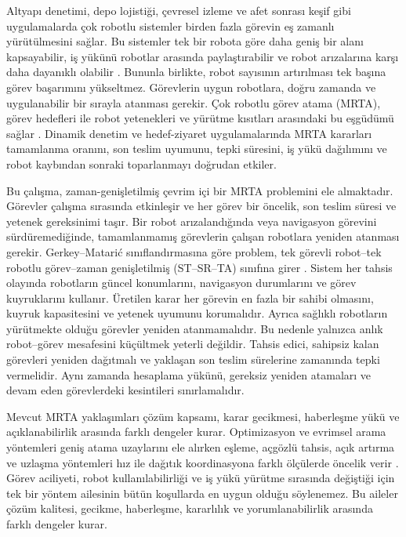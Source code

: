 \documentclass[10pt,letterpaper,onecolumn]{IEEEtran}
\begin{document}
Altyapı denetimi, depo lojistiği, çevresel izleme ve afet sonrası keşif gibi
uygulamalarda çok robotlu sistemler birden fazla görevin eş zamanlı
yürütülmesini sağlar. Bu sistemler tek bir robota göre daha geniş bir alanı
kapsayabilir, iş yükünü robotlar arasında paylaştırabilir ve robot arızalarına
karşı daha dayanıklı olabilir
\cite{khamis2015multi,chakraa2023review}. Bununla birlikte, robot sayısının
artırılması tek başına görev başarımını yükseltmez. Görevlerin uygun robotlara,
doğru zamanda ve uygulanabilir bir sırayla atanması gerekir. Çok robotlu görev
atama (MRTA), görev hedefleri ile robot yetenekleri ve yürütme kısıtları
arasındaki bu eşgüdümü sağlar \cite{gerkey2004formal,
korsah2013comprehensive}. Dinamik denetim ve hedef-ziyaret uygulamalarında MRTA
kararları tamamlanma oranını, son teslim uyumunu, tepki süresini, iş yükü
dağılımını ve robot kaybından sonraki toparlanmayı doğrudan etkiler.

Bu çalışma, zaman-genişletilmiş çevrim içi bir MRTA problemini ele almaktadır.
Görevler çalışma sırasında etkinleşir ve her görev bir öncelik, son teslim süresi
ve yetenek gereksinimi taşır. Bir robot arızalandığında veya navigasyon görevini
sürdüremediğinde, tamamlanmamış görevlerin çalışan robotlara yeniden atanması
gerekir. Gerkey--Matari{\'c} sınıflandırmasına göre problem, tek görevli
robot--tek robotlu görev--zaman genişletilmiş (ST--SR--TA) sınıfına girer
\cite{gerkey2004formal,nunes2017taxonomy}. Sistem her tahsis olayında robotların
güncel konumlarını, navigasyon durumlarını ve görev kuyruklarını kullanır.
Üretilen karar her görevin en fazla bir sahibi olmasını, kuyruk kapasitesini ve
yetenek uyumunu korumalıdır. Ayrıca sağlıklı robotların yürütmekte olduğu
görevler yeniden atanmamalıdır. Bu nedenle yalnızca anlık robot--görev
mesafesini küçültmek yeterli değildir. Tahsis edici,
sahipsiz kalan görevleri yeniden dağıtmalı ve yaklaşan son teslim sürelerine
zamanında tepki vermelidir. Aynı zamanda hesaplama yükünü, gereksiz yeniden
atamaları ve devam eden görevlerdeki kesintileri sınırlamalıdır.

Mevcut MRTA yaklaşımları çözüm kapsamı, karar gecikmesi, haberleşme yükü ve
açıklanabilirlik arasında farklı dengeler kurar. Optimizasyon ve evrimsel arama
yöntemleri geniş atama uzaylarını ele alırken eşleme, açgözlü tahsis, açık
artırma ve uzlaşma yöntemleri hız ile dağıtık koordinasyona farklı ölçülerde
öncelik verir \cite{chakraa2023review,bai2023group,
rostam2024selfadaptive}. Görev aciliyeti, robot kullanılabilirliği ve iş yükü
yürütme sırasında değiştiği için tek bir yöntem ailesinin bütün koşullarda en
uygun olduğu söylenemez. Bu aileler çözüm kalitesi, gecikme, haberleşme,
kararlılık ve yorumlanabilirlik arasında farklı dengeler kurar.
\end{document}
